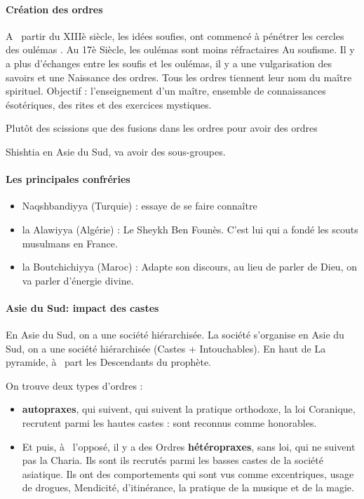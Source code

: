 \paragraph{Création des ordres} A  partir du XIIIè  siècle, 
les idées soufies,  ont 
commencé 
à  pénétrer les 
cercles 
des oulémas . Au 17è 
Siècle, les oulémas 
sont moins réfractaires 
Au soufisme.  Il y a plus d'échanges entre les soufis et les oulémas, il y a une vulgarisation des savoirs et  une 
Naissance des ordres. Tous les ordres tiennent leur nom du maître spirituel. Objectif :  l'enseignement d'un maître,  ensemble 
de connaissances ésotériques, des rites et des exercices mystiques.


 
Plutôt des scissions que des fusions dans les ordres pour avoir des ordres     
\begin{Ex}
Shishtia en Asie du Sud, va avoir des sous-groupes.     
\end{Ex}


\paragraph{Les principales confréries}

\begin{itemize}
    \item Naqshbandiyya (Turquie) : essaye de se faire connaître
    \item la Alawiyya (Algérie) : Le Sheykh Ben Founès. C'est lui qui a fondé les scouts musulmans en France. 
    \item la Boutchichiyya (Maroc) :   Adapte son discours, au lieu de parler de Dieu, on va parler d'énergie divine.
\end{itemize}
\paragraph{Asie du Sud: impact des castes}
En Asie du Sud, on a une société hiérarchisée. 
La société s'organise 
 en Asie du Sud, on a une société hiérarchisée  (Castes + Intouchables). En haut de 
La pyramide, à  part les 
Descendants du prophète. 

On trouve deux types d'ordres :
\begin{itemize}
    \item  \textbf{autopraxes}, 
 qui  suivent, qui  suivent la pratique orthodoxe, la loi 
Coranique, recrutent parmi les hautes castes :  sont reconnus comme honorables.
\item Et puis, à  l'opposé, il y a des 
Ordres \textbf{hétéropraxes}, sans loi, qui  ne suivent pas la 
Charia. Ils sont ils recrutés parmi les basses castes 
de la société asiatique.  Ils ont des comportements qui  sont vus comme excentriques, 
usage de drogues, Mendicité, d'itinérance, la pratique 
de la musique 
et de la magie. 
\end{itemize}
  


